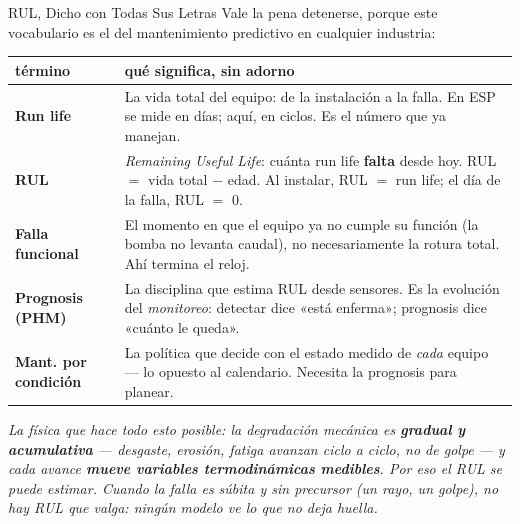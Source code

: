 \documentclass[aspectratio=169, 11pt]{beamer}
\begin{document}
\begin{frame}[shrink=18]{RUL, Dicho con Todas Sus Letras}
  \vspace{-2pt}
  {\footnotesize\color{textMuted}
  Vale la pena detenerse, porque este vocabulario es el del mantenimiento
  predictivo en cualquier industria:}
  \vspace{5pt}
  {\scriptsize
  \begin{center}
  \begin{tabular}{p{}p{}}
    \toprule
    \textbf{término} & \textbf{qué significa, sin adorno} \\
    \midrule
    \textbf{Run life} & La vida total del equipo: de la instalación a la falla. En ESP se mide en días; aquí, en ciclos. Es el número que ya manejan. \\[3pt]
    \textbf{RUL} & \emph{Remaining Useful Life}: cuánta run life \textbf{falta} desde hoy. RUL $=$ vida total $-$ edad. Al instalar, RUL $=$ run life; el día de la falla, RUL $=$ 0. \\[3pt]
    \textbf{Falla funcional} & El momento en que el equipo ya no cumple su función (la bomba no levanta caudal), no necesariamente la rotura total. Ahí termina el reloj. \\[3pt]
    \textbf{Prognosis (PHM)} & La disciplina que estima RUL desde sensores. Es la evolución del \emph{monitoreo}: detectar dice «está enferma»; prognosis dice «cuánto le queda». \\[3pt]
    \textbf{Mant. por condición} & La política que decide con el estado medido de \emph{cada} equipo --- lo opuesto al calendario. Necesita la prognosis para planear. \\
    \bottomrule
  \end{tabular}
  \end{center}}
  \vspace{4pt}
  {\scriptsize\color{arcaDark}\itshape
   La física que hace todo esto posible: la degradación mecánica es
   \textbf{gradual y acumulativa} --- desgaste, erosión, fatiga avanzan
   ciclo a ciclo, no de golpe --- y cada avance \textbf{mueve variables
   termodinámicas medibles}. Por eso el RUL se puede estimar. Cuando la
   falla es súbita y sin precursor (un rayo, un golpe), no hay RUL que
   valga: ningún modelo ve lo que no deja huella.}
\end{frame}
\end{document}

